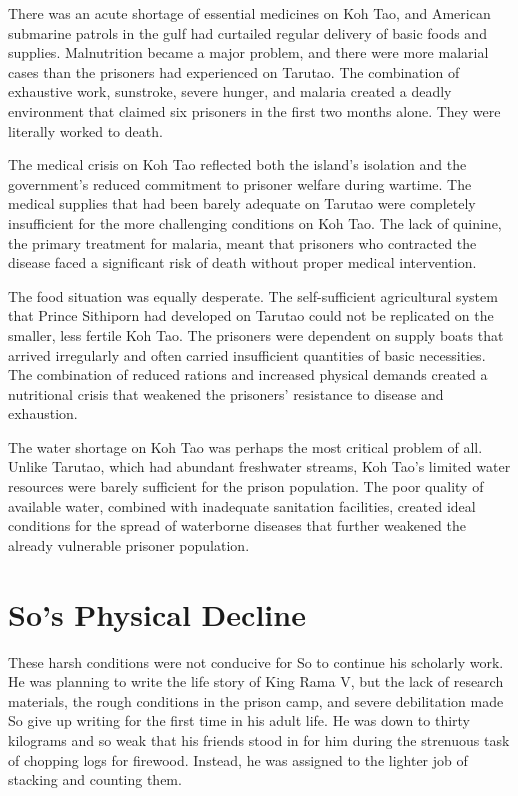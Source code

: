 \documentclass[
  Letterpaper,
]{scrbook}
\begin{document}
There was an acute shortage of essential medicines on Koh Tao, and
American submarine patrols in the gulf had curtailed regular delivery of
basic foods and supplies. Malnutrition became a major problem, and there
were more malarial cases than the prisoners had experienced on Tarutao.
The combination of exhaustive work, sunstroke, severe hunger, and
malaria created a deadly environment that claimed six prisoners in the
first two months alone. They were literally worked to death.

The medical crisis on Koh Tao reflected both the island's isolation and
the government's reduced commitment to prisoner welfare during wartime.
The medical supplies that had been barely adequate on Tarutao were
completely insufficient for the more challenging conditions on Koh Tao.
The lack of quinine, the primary treatment for malaria, meant that
prisoners who contracted the disease faced a significant risk of death
without proper medical intervention.

The food situation was equally desperate. The self-sufficient
agricultural system that Prince Sithiporn had developed on Tarutao could
not be replicated on the smaller, less fertile Koh Tao. The prisoners
were dependent on supply boats that arrived irregularly and often
carried insufficient quantities of basic necessities. The combination of
reduced rations and increased physical demands created a nutritional
crisis that weakened the prisoners' resistance to disease and
exhaustion.

The water shortage on Koh Tao was perhaps the most critical problem of
all. Unlike Tarutao, which had abundant freshwater streams, Koh Tao's
limited water resources were barely sufficient for the prison
population. The poor quality of available water, combined with
inadequate sanitation facilities, created ideal conditions for the
spread of waterborne diseases that further weakened the already
vulnerable prisoner population.

\section{So's Physical Decline}\label{sos-physical-decline}

These harsh conditions were not conducive for So to continue his
scholarly work. He was planning to write the life story of King Rama V,
but the lack of research materials, the rough conditions in the prison
camp, and severe debilitation made So give up writing for the first time
in his adult life. He was down to thirty kilograms and so weak that his
friends stood in for him during the strenuous task of chopping logs for
firewood. Instead, he was assigned to the lighter job of stacking and
counting them.
\end{document}
